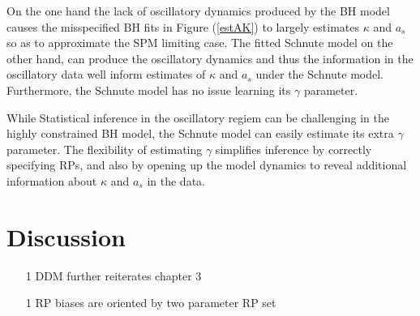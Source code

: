 %
On the one hand the lack of oscillatory dynamics produced by the BH model causes the misspecified
BH fits in Figure (\ref{estAK}) to largely estimates $\kappa$ and $a_s$ so as to
approximate the SPM limiting case. The fitted Schnute model on the other hand, can 
produce the oscillatory dynamics and thus the information in the oscillatory data
well inform estimates of $\kappa$ and $a_s$ under the Schnute model. Furthermore,
the Schnute model has no issue learning its $\gamma$ parameter.

%
While Statistical inference in the oscillatory regiem can be challenging in
the highly constrained BH model, the Schnute model can easily estimate its extra
$\gamma$ parameter. The flexibility of estimating $\gamma$ simplifies inference by 
correctly specifying RPs, and also by opening up the model dynamics to reveal
additional information about $\kappa$ and $a_s$ in the data. %



%
\clearpage
\section{Discussion}

\begin{itemize}
        \item[1] DDM further reiterates chapter 3
        \item[1] RP biases are oriented by two parameter RP set
\end{itemize}

